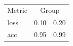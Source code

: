 \begin{tabular}{lcc}
  Metric & \multicolumn{2}{c}{Group} \\
  loss   & 0.10 & 0.20 \\
  acc    & 0.95 & 0.99 \\
\end{tabular}

